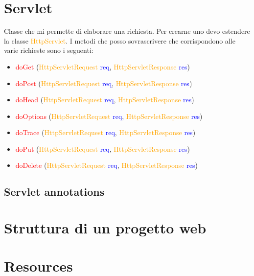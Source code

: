 \documentclass[11pt, letterpaper, titlepage]{article}
\begin{document}
\section{Servlet}
Classe che mi permette di elaborare una richiesta. Per crearne uno devo estendere la classe \textcolor{orange}{HttpServlet}.
I metodi che posso sovrascrivere che corrispondono alle varie richieste sono i seguenti:
\begin{itemize}
    \item \textcolor{red}{doGet} (\textcolor{orange}{HttpServletRequest} \textcolor{blue}{req}, \textcolor{orange}{HttpServletResponse} \textcolor{blue}{res})
    \item \textcolor{red}{doPost} (\textcolor{orange}{HttpServletRequest} \textcolor{blue}{req}, \textcolor{orange}{HttpServletResponse} \textcolor{blue}{res})
    \item \textcolor{red}{doHead} (\textcolor{orange}{HttpServletRequest} \textcolor{blue}{req}, \textcolor{orange}{HttpServletResponse} \textcolor{blue}{res})
    \item \textcolor{red}{doOptions} (\textcolor{orange}{HttpServletRequest} \textcolor{blue}{req}, \textcolor{orange}{HttpServletResponse} \textcolor{blue}{res})
    \item \textcolor{red}{doTrace} (\textcolor{orange}{HttpServletRequest} \textcolor{blue}{req}, \textcolor{orange}{HttpServletResponse} \textcolor{blue}{res})
    \item \textcolor{red}{doPut} (\textcolor{orange}{HttpServletRequest} \textcolor{blue}{req}, \textcolor{orange}{HttpServletResponse} \textcolor{blue}{res})
    \item \textcolor{red}{doDelete} (\textcolor{orange}{HttpServletRequest} \textcolor{blue}{req}, \textcolor{orange}{HttpServletResponse} \textcolor{blue}{res})
\end{itemize}

\subsection{Servlet annotations}

\newpage
\section{Struttura di un progetto web}


\section{Resources}
\end{document}
